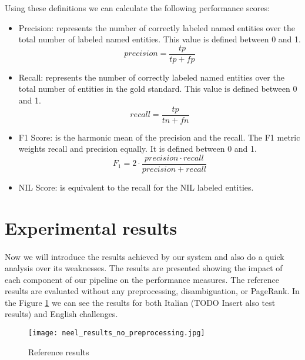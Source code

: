 Using these definitions we can calculate the following performance scores:
\begin{itemize}[itemsep = 0.1em]
\item Precision: represents the number of correctly labeled named entities over the total number of labeled named entities. This value is defined between 0 and 1.
\begin{equation}
precision = \frac{tp}{tp+fp}
\end{equation}

\item Recall: represents the number of correctly labeled named entities over the total number of entities in the gold standard. This value is defined between 0 and 1.
\begin{equation}
recall = \frac{tp}{tn+fn}
\end{equation}
\item F1 Score: is the harmonic mean of the precision and the recall. The F1 metric weights recall and precision equally. It is defined between 0 and 1. 
\begin{equation}
F_1 = 2 \cdot \frac{precision \cdot recall}{precision+recall}
\end{equation}
\item NIL Score: is equivalent to the recall for the NIL labeled entities.
\end{itemize}	

\newpage

\section{Experimental results}
\paragraph{} Now we will introduce the results achieved by our system and also do a quick analysis over its weaknesses. The results are presented showing the impact of each component of our pipeline on the performance measures. The reference results are evaluated without any preprocessing, disambiguation, or PageRank. In the Figure \ref{fig:preprocessing_off} we can see the results for both Italian (TODO Insert also test results) and English challenges.


\begin{figure}[ht]
\texttt{[image: neel\_results\_no\_preprocessing.jpg]}
\caption{Reference results}
\label{fig:preprocessing_off}
\end{figure}
\vspace{-20pt}

